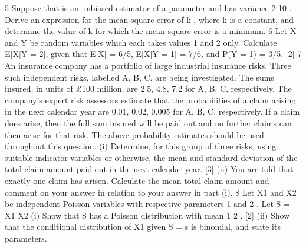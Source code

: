 
5 Suppose that is an unbiased estimator of a parameter and has variance
2
10
.
Derive an expression for the mean square error of k , where k is a constant, and
determine the value of k for which the mean square error is a minimum.
6 Let X and Y be random variables which each takes values 1 and 2 only.
Calculate E[X|Y = 2], given that E[X] = 6/5, E[X|Y = 1] = 7/6, and P(Y = 1) = 3/5.
[2]
7 An insurance company has a portfolio of large industrial insurance risks. Three such
independent risks, labelled A, B, C, are being investigated. The sums insured, in units
of £100 million, are 2.5, 4.8, 7.2 for A, B, C, respectively. The company's expert risk
assessors estimate that the probabilities of a claim arising in the next calendar year are
0.01, 0.02, 0.005 for A, B, C, respectively. If a claim does arise, then the full sum
insured will be paid out and no further claims can then arise for that risk. The above
probability estimates should be used throughout this question.
(i) Determine, for this group of three risks, using suitable indicator variables or
otherwise, the mean and standard deviation of the total claim amount paid out
in the next calendar year.
[3]
(ii) You are told that exactly one claim has arisen. Calculate the mean total claim
amount and comment on your answer in relation to your answer in part (i).
8 Let X1 and X2 be independent Poisson variables with respective parameters 1
and 2 .
Let S = X1 X2
(i) Show that S has a Poisson distribution with mean 1 2 . [2]
(ii) Show that the conditional distribution of X1 given S = s is binomial, and state
its parameters.

